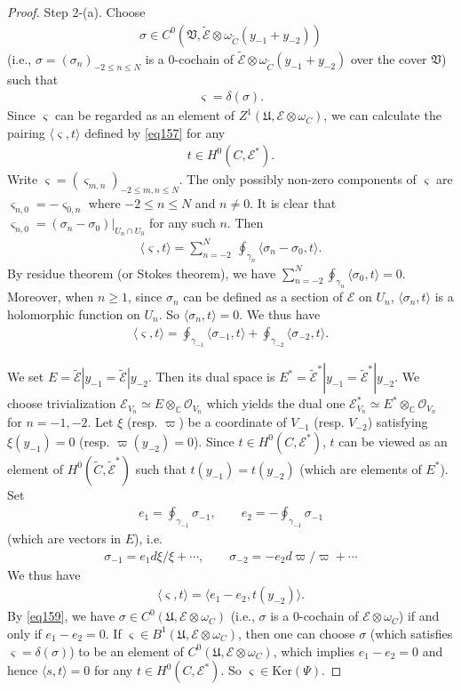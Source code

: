 \documentclass[12pt,a4paper,notitlepage]{report}
\theoremstyle{definition}
\theoremstyle{plain}
\newcommand{\fk}{\mathfrak}
\newcommand{\wtd}{\widetilde}
\newcommand{\bk}[1]{\langle {#1}\rangle}
\newcommand{\scr}{\mathscr}
\newcommand{\sgm}{\varsigma}
\newcommand{\Cbb}{\mathbb C}
\newcommand{\Ker}{\mathrm{Ker}}
\numberwithin{equation}{section}
\begin{document}
\begin{proof}
Step 2-(a). Choose 
\begin{align*}
\sigma\in C^0(\fk V,\wtd{\scr E}\otimes \omega_{\wtd C}(y_{-1}+y_{-2}))
\end{align*}
(i.e., $\sigma=(\sigma_n)_{-2\leq n\leq N}$ is a $0$-cochain of $\wtd{\scr E}\otimes \omega_{\wtd C}(y_{-1}+y_{-2})$ over the cover $\fk V$) such that
\begin{align*}
\sgm=\delta(\sigma).
\end{align*}
Since $\sgm$ can be regarded as an element of $Z^1(\fk U,\scr E\otimes\omega_C)$, we can  calculate the pairing $\bk{\sgm,t}$ defined by \eqref{eq157} for any
\begin{align*}
t\in H^0(C,\scr E^*).
\end{align*}
Write $\sgm=(\sgm_{m,n})_{-2\leq m,n\leq N}$. The only possibly non-zero components of $\sgm$ are $\sgm_{n,0}=-\sgm_{0,n}$ where $-2\leq n\leq N$ and $n\neq 0$. It is clear that $\sgm_{n,0}=(\sigma_n-\sigma_0)|_{U_n\cap U_0}$ for any such $n$. Then
\begin{align*}
\bk{\sgm,t}=\sum_{n=-2}^N~\oint_{\gamma_n}\bk{\sigma_n-\sigma_0,t}.
\end{align*}
By residue theorem (or Stokes theorem), we have $\sum_{n=-2}^{N}\oint_{\gamma_n}\bk{\sigma_0,t}=0$. Moreover, when $n\geq 1$, since $\sigma_n$ can be defined as a section of $\scr E$ on $U_n$, $\bk{\sigma_n,t}$ is a holomorphic function on $U_n$. So $\bk{\sigma_n,t}=0$. We thus have
\begin{align*}
\bk{\sgm,t}=\oint_{\gamma_{-1}}\bk{\sigma_{-1},t}+\oint_{\gamma_{-2}}\bk{\sigma_{-2},t}.
\end{align*}

We set $E=\wtd{\scr E}|y_{-1}=\wtd{\scr E}|y_{-2}$. Then its dual space is $E^*=\wtd{\scr E}^*|y_{-1}=\wtd{\scr E}^*|y_{-2}$. We choose trivialization $\scr E_{V_n}\simeq E\otimes_\Cbb\scr O_{V_n}$ which yields the dual one $\scr E^*_{V_n}\simeq E^*\otimes_\Cbb\scr O_{V_n}$ for $n=-1,-2$. Let $\xi$ (resp. $\varpi$) be a coordinate of $V_{-1}$ (resp. $V_{-2}$) satisfying $\xi(y_{-1})=0$ (resp. $\varpi(y_{-2})=0$). Since $t\in H^0(C,\scr E^*)$, $t$ can  be viewed as an element of $H^0(\wtd C,\wtd{\scr E}^*)$ such that $t(y_{-1})=t(y_{-2})$ (which are elements of $E^*$). Set 
\begin{align*}
e_1=\oint_{\gamma_{-1}}\sigma_{-1},\qquad e_2=-\oint_{\gamma_{-1}}\sigma_{-1}
\end{align*}
(which are vectors in $E$), i.e.
\begin{align}
\sigma_{-1}=e_1d\xi/\xi+\cdots,\qquad \sigma_{-2}=-e_2d\varpi/\varpi+\cdots\label{eq160}
\end{align}
We thus have
\begin{align}
\bk{\sgm,t}=\bk{e_1-e_2,t(y_{-2})}.\label{eq161}
\end{align}
By \eqref{eq159}, we have $\sigma\in C^0(\fk U,\scr E\otimes\omega_C)$ (i.e., $\sigma$ is a $0$-cochain of $\scr E\otimes\omega_C$) if and only if $e_1-e_2=0$. If $\sgm\in B^1(\fk U,\scr E\otimes\omega_C)$, then one can choose $\sigma$ (which satisfies $\sgm=\delta(\sigma)$) to be an element of $C^0(\fk U,\scr E\otimes\omega_C)$, which implies $e_1-e_2=0$ and hence $\bk{s,t}=0$ for any $t\in H^0(C,\scr E^*)$. So $\sgm\in\Ker(\Psi)$. 


\end{proof}
\end{document}
